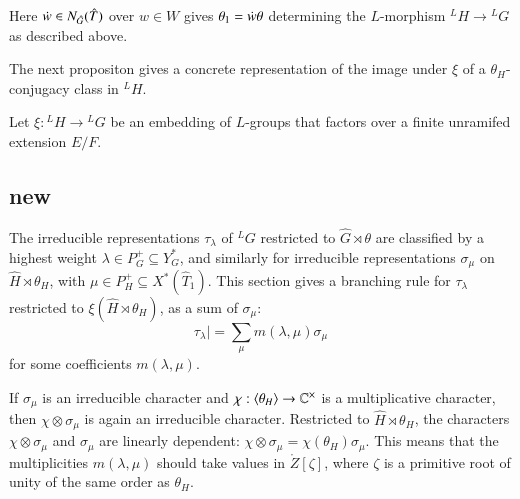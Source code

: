 
Here
$\dot w\in N_{\hat G}(\hat T)$ over $w\in W$ gives
$\theta_1=\dot w\theta$ determining the $L$-morphism ${}^LH\to {}^LG$
as described above.  

The next propositon gives a concrete representation of the image under
$\xi$ of a $\theta_H$-conjugacy class in ${}^LH$.  

Let $\xi:{}^LH\to {}^LG$ be an embedding of
  $L$-groups that factors over a finite unramifed extension $E/F$.

\subsection{new}



The irreducible representations $\tau_\lambda$ of ${}^LG$ restricted
to $\hat G\rtimes\theta$ are classified by a highest weight
$\lambda\in P^+_G\subseteq Y^*_G$, and similarly for irreducible
representations $\sigma_\mu$ on $\hat H\rtimes \theta_H$, with $\mu\in
P^+_H\subseteq X^*(\hat T_1)$.
This section gives a branching rule for $\tau_\lambda$ restricted to
$\xi(\hat H\rtimes\theta_H)$, as a sum of $\sigma_\mu$:
\[
\tau_\lambda| = \sum_\mu m(\lambda,\mu) \sigma_\mu
\]
for some coefficients $m(\lambda,\mu)$.  

If $\sigma_\mu$ is an irreducible character and
$\chi:\langle{\theta_H}\rangle\to \mathbb{C}^\times$ is a multiplicative
character, then $ \chi\otimes\sigma_\mu$ is again an irreducible
character.  Restricted to $\hat H\rtimes\theta_H$, the characters
$\chi\otimes\sigma_\mu$ and $\sigma_\mu$ are linearly dependent:
$\chi\otimes\sigma_\mu = \chi(\theta_H) \sigma_\mu $.  This
means that the multiplicities $m(\lambda,\mu)$ should take values in
$\ring{Z}[\zeta]$, where $\zeta$ is a primitive root of unity of the
same order as $\theta_H$.

